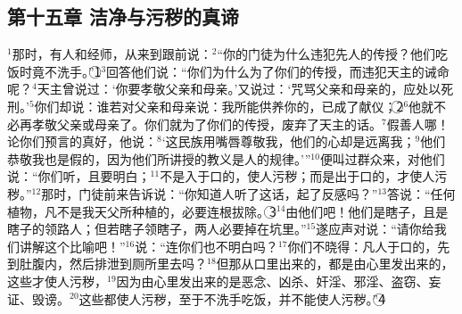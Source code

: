 \subsection{第十五章 洁净与污秽的真谛}
$^{1}$那时，有\UL[法利塞]人和经师，从\UL[耶路撒冷]来到\UL[耶稣]跟前说：$^{2}$“你的门徒为什么违犯先人的传授？他们吃饭时竟不洗手。”\textcircled{1}$^{3}$\UL[耶稣]回答他们说：“你们为什么为了你们的传授，而违犯天主的诫命呢？$^{4}$天主曾说过：‘你要孝敬父亲和母亲。’又说过：‘咒骂父亲和母亲的，应处以死刑。’$^{5}$你们却说：谁若对父亲和母亲说：我所能供养你的，已成了献仪；\textcircled{2}$^{6}$他就不必再孝敬父亲或母亲了。你们就为了你们的传授，废弃了天主的话。$^{7}$假善人哪！\UL[依撒意亚]论你们预言的真好，他说：$^{8}$‘这民族用嘴唇尊敬我，他们的心却是远离我；$^{9}$他们恭敬我也是假的，因为他们所讲授的教义是人的规律。’”$^{10}$\UL[耶稣]便叫过群众来，对他们说：“你们听，且要明白；$^{11}$不是入于口的，使人污秽；而是出于口的，才使人污秽。”$^{12}$那时，门徒前来告诉\UL[耶稣]说：“你知道\UL[法利塞]人听了这话，起了反感吗？”$^{13}$\UL[耶稣]答说：“任何植物，凡不是我天父所种植的，必要连根拔除。\textcircled{3}$^{14}$由他们吧！他们是瞎子，且是瞎子的领路人；但若瞎子领瞎子，两人必要掉在坑里。”$^{15}$\UL[伯多禄]遂应声对\UL[耶稣]说：“请你给我们讲解这个比喻吧！”$^{16}$\UL[耶稣]说：“连你们也不明白吗？$^{17}$你们不晓得：凡人于口的，先到肚腹内，然后排泄到厕所里去吗？$^{18}$但那从口里出来的，都是由心里发出来的，这些才使人污秽，$^{19}$因为由心里发出来的是恶念、凶杀、奸淫、邪淫、盗窃、妄证、毁谤。$^{20}$这些都使人污秽，至于不洗手吃饭，并不能使人污秽。”\textcircled{4}


